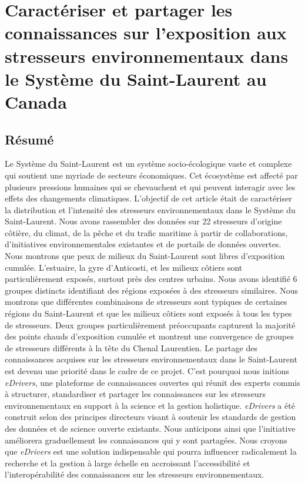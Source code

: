 \chapter{Caractériser et partager les connaissances sur l’exposition aux stresseurs environnementaux dans le Système du Saint-Laurent au Canada}
\label{chap4}

\section{Résumé}

Le Système du Saint-Laurent est un système socio-écologique vaste et complexe qui soutient une myriade de secteurs économiques. Cet écosystème est affecté par plusieurs pressions humaines qui se chevauchent et qui peuvent interagir avec les effets des changements climatiques. L’objectif de cet article était de caractériser la distribution et l’intensité des stresseurs environnementaux dans le Système du Saint-Laurent. Nous avons rassembler des données sur 22 stresseurs d’origine côtière, du climat, de la pêche et du trafic maritime à partir de collaborations, d’initiatives environnementales existantes et de portails de données ouvertes. Nous montrons que peux de milieux du Saint-Laurent sont libres d’exposition cumulée. L’estuaire, la gyre d’Anticosti, et les milieux côtiers sont particulièrement exposés, surtout près des centres urbains. Nous avons identifié 6 groupes distincts identifiant des régions exposées à des stresseurs similaires. Nous montrons que différentes combinaisons de stresseurs sont typiques de certaines régions du Saint-Laurent et que les milieux côtiers sont exposés à tous les types de stresseurs. Deux groupes particulièrement préoccupants capturent la majorité des points chauds d’exposition cumulée et montrent une convergence de groupes de stresseurs différents à la tête du Chenal Laurentien. Le partage des connaissances acquises sur les stresseurs environnementaux dans le Saint-Laurent est devenu une priorité dans le cadre de ce projet. C’est pourquoi nous initions \textit{eDrivers}, une plateforme de connaissances ouvertes qui réunit des experts commis à structurer, standardiser et partager les connaissances sur les stresseurs environnementaux en support à la science et la gestion holistique. \textit{eDrivers} a été construit selon des principes directeurs visant à soutenir les standards de gestion des données et de science ouverte existants. Nous anticipons ainsi que l’initiative améliorera graduellement les connaissances qui y sont partagées. Nous croyons que \textit{eDrivers} est une solution indispensable qui pourra influencer radicalement la recherche et la gestion à large échelle en accroissant l’accessibilité et l’interopérabilité des connaissances sur les stresseurs environnementaux.

